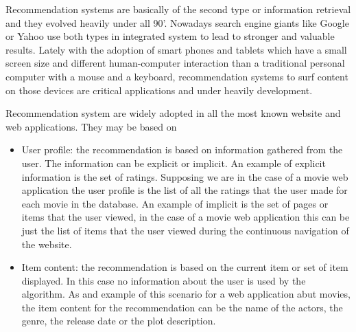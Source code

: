 Recommendation systems are basically of the second type or information retrieval and they evolved heavily under all 90'. Nowadays search engine giants like Google or Yahoo use both types in integrated system to lead to stronger and valuable results. Lately with the adoption of smart phones and tablets which have a small screen size and different human-computer interaction than a traditional personal computer with a mouse and a keyboard, recommendation systems to surf content on those devices are critical applications and under heavily development. 

Recommendation system are widely adopted in all the most known website and web applications. They may be based on 
\begin{itemize}
\item User profile: the recommendation is based on information gathered from the user. The information can be explicit or implicit. An example of explicit information is the set of ratings. Supposing we are in the case of a movie web application the user profile is the list of all the ratings that the user made for each movie in the database. An example of implicit is the set of pages or items that the user viewed, in the case of a movie web application this can be just the list of items that the user viewed during the continuous navigation of the website.
\item Item content: the recommendation is based on the current item or set of item displayed. In this case no information about the user is used by the algorithm. As and example of this scenario for a web application abut movies, the item content for the recommendation can be the name of the actors, the genre, the release date or the plot description.
\end{itemize}

